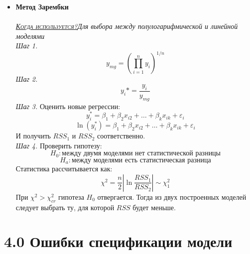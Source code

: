 \documentclass[a0,final]{a0poster}
\begin{document}
\begin{multicols}{4}
\begin{itemize}
\item \textbf{Метод Зарембки}\\
\\
\underline{\textsc{\textit{Когда используется?}}}\textit{Для выбора между полулогарифмической и линейной моделями}\\
\textit{Шаг 1.} \[y_{mg} = (\prod\limits_{i=1}^ny_i)^{1/n}\]
\textit{Шаг 2.} \[y_i* = \frac{y_i}{y_{mg}}\]
\textit{Шаг 3.} Оценить новые регрессии: \\
\[y_i^* = \beta_1 + \beta_2x_{i2} + \ldots + \beta_{k}x_{ik} +\varepsilon_i\]
\[\ln(y_i^*) = \beta_1 + \beta_2x_{i2} + \ldots + \beta_{k}x_{ik} +\varepsilon_i\]
И получить $RSS_1$ и $RSS_2$ соответственно.\\
\textit{Шаг 4.} Проверить гипотезу:
\[H_0: \text{между двумя моделями нет статистической разницы}\]
\[H_a: \text{между моделями есть статистическая разница} \]
Статистика рассчитывается как:
\[\chi^2 = \frac{n}{2}|\ln\frac{RSS_1}{RSS_2}| \sim \chi^2_1\]
При $\chi^2 > \chi^2_{cr}$ гипотеза $H_0$ отвергается.
Тогда из двух построенных моделей следует выбрать ту, для которой $RSS$ будет меньше.
\end{itemize}

\section*{4.0 Ошибки спецификации модели}

\end{multicols}
\end{document}
